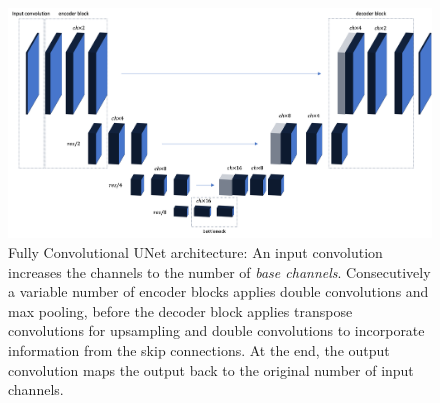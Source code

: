 \begin{figure}
    \centering
    \includegraphics[width=.7\textwidth]{images/unet.png}
    \caption[Fully Convolutional UNet]{Fully Convolutional UNet architecture: An input convolution increases the channels to the number of \textit{base channels}. Consecutively a variable number of encoder blocks applies double convolutions and max pooling, before the decoder block applies transpose convolutions for upsampling and double convolutions to incorporate information from the skip connections. At the end, the output convolution maps the output back to the original number of input channels.}
    \label{fig:unetconv}
\end{figure}

